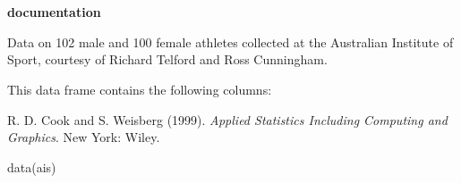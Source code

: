 \documentclass[letterpaper]{book}
\begin{document}
\chapter*{}
\begin{center}
{\textbf{\huge \R{} documentation}} \par{}
\par\medskip{\large \today}
\end{center}
\begin{Description}\relax
Data on 102 male and 100 female athletes collected at the Australian
Institute of Sport, courtesy of Richard Telford and Ross Cunningham.\end{Description}
\begin{Format}\relax
This data frame contains the following columns:
\end{Format}
\begin{Details}\relax
\end{Details}
\begin{Source}\relax
R. D. Cook and S. Weisberg (1999). \emph{Applied
Statistics Including Computing and Graphics}.  New York:  Wiley.\end{Source}
\begin{Examples}
\begin{ExampleCode}
data(ais)
\end{ExampleCode}
\end{Examples}
\end{document}
